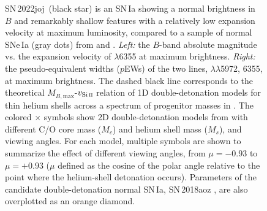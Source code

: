 \documentclass[twocolumn]{aastex631}
\newcommand{\sn}{SN\,2022joj}
\begin{document}
\begin{CJK*}{UTF8}{gbsn}
\begin{figure}
    \caption{\sn\ (black star) is an SN\,Ia showing a normal brightness in $B$ and remarkably shallow  features with a relatively low expansion velocity at maximum luminosity, compared to a sample of normal SNe\,Ia (gray dots) from \citet{Zheng_2018} and \citet{Burrow_2020}. \textit{Left:} the $B$-band absolute magnitude vs. the expansion velocity of  $\lambda$6355 at maximum brightness. \textit{Right:} the pseudo-equivalent widths ($p$EWs) of the two  lines,  $\lambda\lambda$5972, 6355, at maximum brightness. The dashed black line corresponds to the theoretical $M_{B,\mathrm{max}}$-$v_\mathrm{Si\,\textsc{ii}}$ relation of 1D double-detonation models for thin helium shells across a spectrum of progenitor masses in \citet{polin_observational_2019}. The colored $\times$ symbols show 2D double-detonation models from \citet{Shen_2D_2021} with different C/O core mass ($M_c$) and helium shell mass ($M_s$), and viewing angles. For each model, multiple symbols are shown to summarize the effect of different viewing angles, from $\mu = -0.93$ to $\mu=+0.93$ ($\mu$ defined as the cosine of the polar angle relative to the point where the helium-shell detonation occurs). Parameters of the candidate double-detonation normal SN\,Ia, SN\,2018aoz \citep{Ni_18aoz_2023}, are also overplotted as an orange diamond.}
    \label{fig:phase_space}
\end{figure}


\end{CJK*}
\end{document}
